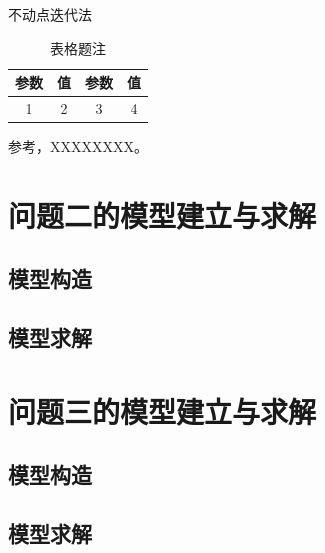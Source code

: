 \documentclass[12pt,a4paper]{article}
\begin{document}
\begin{algorithm}
    \caption{不动点迭代法}\label{不动点迭代法}


\end{algorithm}



\begin{table}[h!]
    \centering
    \caption{表格题注}
    \begin{tabular}{cc|cc}
    \toprule
    参数 & 值 & 参数 & 值 \\ 
    \midrule
    1 & 2 & 3 & 4 \\
    \bottomrule
    \end{tabular}
    \label{table:表格题注}
    \end{table}

参考\cite{key}，XXXXXXXX。

\clearpage
\section{问题二的模型建立与求解}\label{问题二的模型建立与求解}

\subsection{模型构造}

\subsection{模型求解}

\clearpage
\section{问题三的模型建立与求解}

\subsection{模型构造}

\subsection{模型求解}
\end{document}
